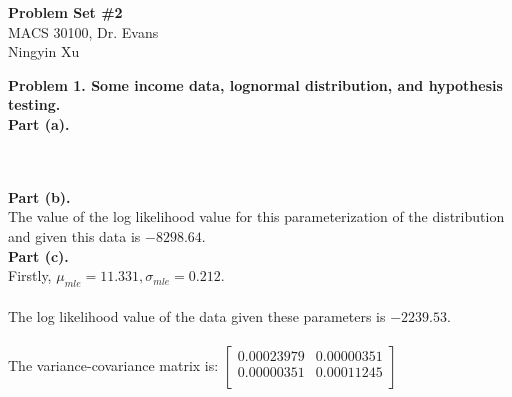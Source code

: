 \documentclass[letterpaper,12pt]{article}
\theoremstyle{definition}
\begin{document}
\begin{flushleft}
  \textbf{\large{Problem Set \#2}} \\
  MACS 30100, Dr. Evans \\
  Ningyin Xu
\end{flushleft}

\vspace{5mm}

\noindent\textbf{Problem 1. Some income data, lognormal distribution, and hypothesis testing.}\\

\noindent\textbf{Part (a).} \\
\begin{figure}[htb]\centering\captionsetup{width=4.0in}
  \label{Fig1a}
\end{figure}\\
\\

\noindent\textbf{Part (b).} 
\\
The value of the log likelihood value for this parameterization of the distribution
and given this data is $-8298.64$.\\

\noindent\textbf{Part (c).}
\\
Firstly, $\mu_{mle}=11.331,\sigma_{mle}=0.212$. \\
\\
The log likelihood value of the data given these parameters is $-2239.53$.\\
\\
The variance-covariance matrix is:
$
\begin{bmatrix} 
0.00023979 & 0.00000351\\ 
0.00000351 & 0.00011245\\ 
\end{bmatrix}
$
\\
\end{document}
